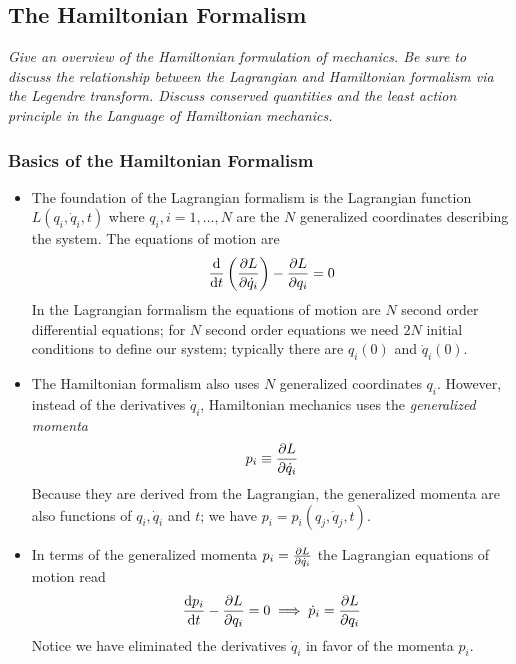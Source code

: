\documentclass[11pt, a4paper]{article}
\begin{document}
\subsection{The Hamiltonian Formalism}
\textit{Give an overview of the Hamiltonian formulation of mechanics. Be sure to discuss the relationship between the Lagrangian and Hamiltonian formalism via the Legendre transform. Discuss conserved quantities and the least action principle in the Language of Hamiltonian mechanics.}

\subsubsection{Basics of the Hamiltonian Formalism}
\begin{itemize}
	\item The foundation of the Lagrangian formalism is the Lagrangian function $ L(q_{i}, \dot{q}_{i}, t) $ where $ q_{i},  i = 1, \dots, N $ are the $ N $ generalized coordinates describing the system. The equations of motion are
	\begin{equation*}
		\dv{}{t}\left(\pdv{L}{\dot{q}_{i}}\right) - \pdv{L}{q_{i}} = 0
	\end{equation*}
	In the Lagrangian formalism the equations of motion are $ N $ second order differential equations; for $ N $ second order equations we need $ 2N $ initial conditions to define our system; typically there are $ q_{i}(0) $ and $ \dot{q}_{i}(0) $. 
	
	\item The Hamiltonian formalism also uses $ N $ generalized coordinates $ q_{i} $. However, instead of the derivatives $ \dot{q}_{i} $, Hamiltonian mechanics uses the \textit{generalized momenta} 
	\begin{equation*}
		p_{i} \equiv \pdv{L}{\dot{q}_{i}}
	\end{equation*}
	Because they are derived from the Lagrangian, the generalized momenta are also functions of $ q_{i}, \dot{q}_{i} $ and $ t $; we have $ p_{i} = p_{i}(q_{j}, \dot{q}_{j}, t) $. 
	
	\item In terms of the generalized momenta $ p_{i} = \pdv{L}{\dot{q}_{i}} $ the Lagrangian equations of motion read
	\begin{equation*}
		\dv{p_{i}}{t} - \pdv{L}{q_{i}} = 0 \implies \dot{p}_{i} = \pdv{L}{q_{i}}
	\end{equation*}
	Notice we have eliminated the derivatives $ \dot{q}_{i} $ in favor of the momenta $ p_{i} $.
	

\end{itemize}
\end{document}
